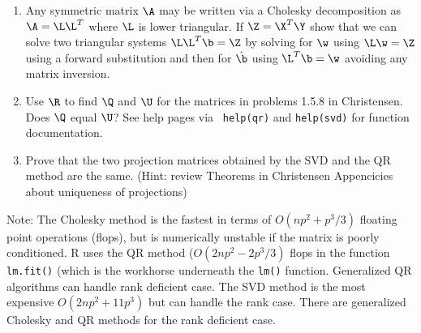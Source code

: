 \documentclass[12pt]{article}
\begin{document}
\begin{enumerate}
\begin{enumerate}
\item Any symmetric matrix $\A$ may be written via a Cholesky
  decomposition as $\A = \L \L^T$ where $\L$
  is lower triangular.   If $\Z = \X^T\Y$  show that we can solve two
  triangular systems $\L \L^T \b = \Z$ by solving for $\w$ using  $\L \w = \Z$ using a
  forward substitution and then for $\hat{\b}$ using $\L^T \b =
  \w$ avoiding any matrix inversion.

\item Use $\R$ to find $\Q$ and $\U$ for the matrices in problems 1.5.8 in
  Christensen. Does $\Q$ equal $\U$?   See help pages via {\tt
    help(qr)} and {\tt help(svd)} for function documentation.
\item Prove that the two projection matrices obtained by the SVD and
  the QR method are the same.  (Hint:  review Theorems in Christensen
  Appencicies about uniqueness of projections)

  \end{enumerate}
  Note: The Cholesky method is the fastest in terms of
  $O(n p^2 + p^3/3)$ floating point operations (flops), but is
  numerically unstable if the matrix is poorly conditioned.  R uses
  the QR method ($O(2 n p^2 - 2p^3/3)$ flops in the function {\tt lm.fit()}
  (which is the workhorse underneath the {\tt lm()} function.  Generalized QR
  algorithms can handle rank deficient case.  The SVD method is the
  most expensive $O(2 n p^2 + 11 p^3)$ but can handle the rank case.
  There are generalized Cholesky and QR methods for the rank deficient
  case.
\end{enumerate}
\end{document}
